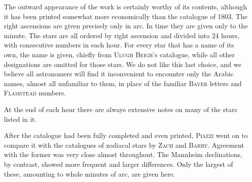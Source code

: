 The outward appearance of the work is certainly worthy of its contents, although it has been printed somewhat more economically than the catalogue of 1803. The right ascensions are given precisely only in arc. In time they are given only to the minute. The stars are all ordered by right ascension and divided into 24 hours, with consecutive numbers in each hour. For every star that has a name of its own, the name is given, chiefly from \textsc{Ulugh Beigh}’s catalogue, while all other designations are omitted for those stars. We do not like this last choice, and we believe all astronomers will find it inconvenient to encounter only the Arabic names, almost all unfamiliar to them, in place of the familiar \textsc{Bayer} letters and \textsc{Flamstead} numbers.

At the end of each hour there are always extensive notes on many of the stars listed in it.

After the catalogue had been fully completed and even printed, \textsc{Piazzi} went on to compare it with the catalogues of zodiacal stars by \textsc{Zach} and \textsc{Barry}. Agreement with the former was very close almost throughout. The Mannheim declinations, by contrast, showed more frequent and larger differences. Only the largest of these, amounting to whole minutes of arc, are given here.

